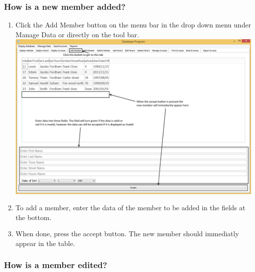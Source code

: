 \subsubsection{How is a new member added?}
\label{add_member}

\begin{enumerate}
	\item Click the Add Member button on the menu bar in the drop down menu under Manage Data or directly on the tool bar.
\includegraphics[width=\textwidth]{./Manual/Images/AddMember1.png}
	\item To add a member, enter the data of the member to be added in the fields at the bottom.
	\item When done, press the accept button. The new member should immediatly appear in the table.
\end{enumerate}

\subsubsection{How is a member edited?}
\label{edit_member}

